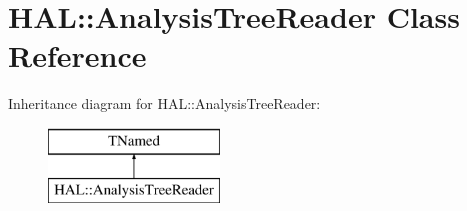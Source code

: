 \hypertarget{class_h_a_l_1_1_analysis_tree_reader}{\section{H\+A\+L\+:\+:Analysis\+Tree\+Reader Class Reference}
\label{class_h_a_l_1_1_analysis_tree_reader}
}
Inheritance diagram for H\+A\+L\+:\+:Analysis\+Tree\+Reader\+:\begin{figure}[H]
\begin{center}
\leavevmode
\includegraphics[height=2.000000cm]{class_h_a_l_1_1_analysis_tree_reader}
\end{center}
\end{figure}
